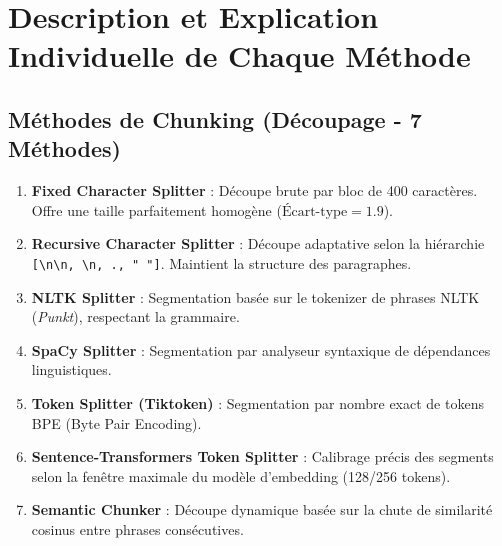 \documentclass[12pt,a4paper,oneside]{report}
\begin{document}
\section{Description et Explication Individuelle de Chaque Méthode}

\subsection{Méthodes de Chunking (Découpage - 7 Méthodes)}
\begin{enumerate}
    \item \textbf{Fixed Character Splitter} : Découpe brute par bloc de 400 caractères. Offre une taille parfaitement homogène ($\text{Écart-type} = 1.9$).
    \item \textbf{Recursive Character Splitter} : Découpe adaptative selon la hiérarchie \texttt{[\textbackslash n\textbackslash n, \textbackslash n, ., " "]}. Maintient la structure des paragraphes.
    \item \textbf{NLTK Splitter} : Segmentation basée sur le tokenizer de phrases NLTK (\textit{Punkt}), respectant la grammaire.
    \item \textbf{SpaCy Splitter} : Segmentation par analyseur syntaxique de dépendances linguistiques.
    \item \textbf{Token Splitter (Tiktoken)} : Segmentation par nombre exact de tokens BPE (Byte Pair Encoding).
    \item \textbf{Sentence-Transformers Token Splitter} : Calibrage précis des segments selon la fenêtre maximale du modèle d'embedding (128/256 tokens).
    \item \textbf{Semantic Chunker} : Découpe dynamique basée sur la chute de similarité cosinus entre phrases consécutives.
\end{enumerate}
\end{document}
